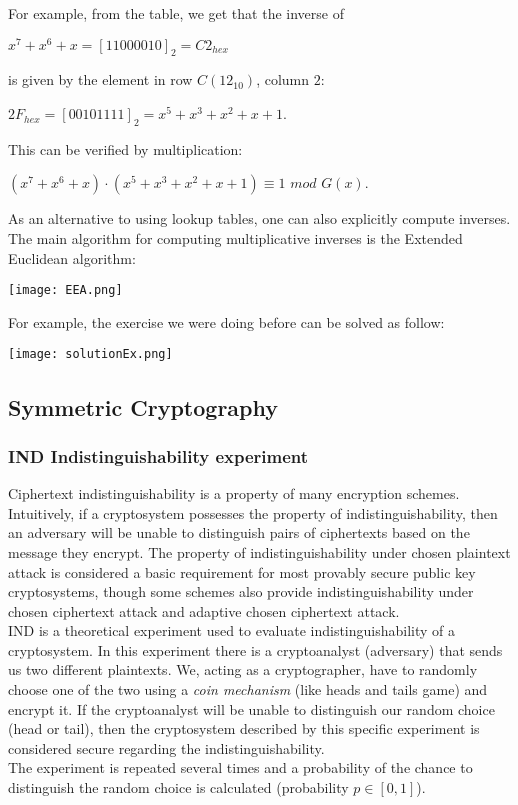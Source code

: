 \documentclass{article}
\begin{document}
For example, from the table, we get that the inverse of
\begin{center}
    $x^7 + x^6 + x = [11000010]_2 = C2_{hex}$
\end{center}
is given by the element in row $C (12_{10})$, column $2$:
\begin{center}
    $2F_{hex} = [00101111]_2 = x^5 + x^3 + x^2 +x +1$.
\end{center}
This can be verified by multiplication:
\begin{center}
    $(x^7 + x^6 + x) \cdot (x^5 + x^3 + x^2 + x + 1) \equiv 1$ $mod$ $G(x)$.
\end{center}
As an alternative to using lookup tables, one can also explicitly compute inverses. The main algorithm for computing multiplicative inverses is the Extended Euclidean algorithm:
\begin{center}
    \texttt{[image: EEA.png]}
\end{center}

For example, the exercise we were doing before can be solved as follow:
\begin{center}
    \texttt{[image: solutionEx.png]}
\end{center}

\subsection{Symmetric Cryptography}
\subsubsection{IND Indistinguishability experiment}
Ciphertext indistinguishability is a property of many encryption schemes. Intuitively, if a cryptosystem possesses the property of indistinguishability, then an adversary will be unable to distinguish pairs of ciphertexts based on the message they encrypt. The property of indistinguishability under chosen plaintext attack is considered a basic requirement for most provably secure public key cryptosystems, though some schemes also provide indistinguishability under chosen ciphertext attack and adaptive chosen ciphertext attack.\\
IND is a theoretical experiment used to evaluate indistinguishability of a cryptosystem.
In this experiment there is a cryptoanalyst (adversary) that sends us two different plaintexts. We, acting as a cryptographer, have to randomly choose one of the two using a \textit{coin mechanism} (like heads and tails game) and encrypt it. If the cryptoanalyst will be unable to distinguish our random choice (head or tail), then the cryptosystem described by this specific experiment is considered secure regarding the indistinguishability.\\
The experiment is repeated several times and a probability of the chance to distinguish the random choice is calculated (probability $p \in [0,1]$).
\end{document}
